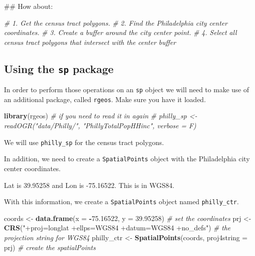 \documentclass[]{book}
\newenvironment{Shaded}{\begin{snugshade}}{\end{snugshade}}
\newcommand{\KeywordTok}[1]{\textcolor[rgb]{0.13,0.29,0.53}{\textbf{#1}}}
\newcommand{\DataTypeTok}[1]{\textcolor[rgb]{0.13,0.29,0.53}{#1}}
\newcommand{\FloatTok}[1]{\textcolor[rgb]{0.00,0.00,0.81}{#1}}
\newcommand{\StringTok}[1]{\textcolor[rgb]{0.31,0.60,0.02}{#1}}
\newcommand{\CommentTok}[1]{\textcolor[rgb]{0.56,0.35,0.01}{\textit{#1}}}
\newcommand{\OperatorTok}[1]{\textcolor[rgb]{0.81,0.36,0.00}{\textbf{#1}}}
\newcommand{\NormalTok}[1]{#1}
\theoremstyle{definition}
\theoremstyle{definition}
\theoremstyle{definition}
\theoremstyle{remark}
\begin{document}
\begin{Shaded}
\begin{Highlighting}[]
\NormalTok{## How about:}

\CommentTok{# 1. Get the census tract polygons.}
\CommentTok{# 2. Find the Philadelphia city center coordinates.}
\CommentTok{# 3. Create a buffer around the city center point.}
\CommentTok{# 4. Select all census tract polygons that intersect with the center buffer}
\end{Highlighting}
\end{Shaded}

\subsection{\texorpdfstring{Using the \texttt{sp}
package}{Using the sp package}}\label{using-the-sp-package}

In order to perform those operations on an \texttt{sp} object we will
need to make use of an additional package, called \texttt{rgeos}. Make
sure you have it loaded.

\begin{Shaded}
\begin{Highlighting}[]
\KeywordTok{library}\NormalTok{(rgeos)}
\CommentTok{# if you need to read it in again}
\CommentTok{# philly_sp <- readOGR("data/Philly/", "PhillyTotalPopHHinc", verbose = F)}
\end{Highlighting}
\end{Shaded}

We will use \texttt{philly\_sp} for the census tract polygons.

In addition, we need to create a \texttt{SpatialPoints} object with the
Philadelphia city center coordinates.

Lat is 39.95258 and Lon is -75.16522. This is in WGS84.

With this information, we create a \texttt{SpatialPoints} object named
\texttt{philly\_ctr}.

\begin{Shaded}
\begin{Highlighting}[]
\NormalTok{coords <-}\StringTok{ }\KeywordTok{data.frame}\NormalTok{(}\DataTypeTok{x =} \OperatorTok{-}\FloatTok{75.16522}\NormalTok{, }\DataTypeTok{y =} \FloatTok{39.95258}\NormalTok{) }\CommentTok{# set the coordinates}
\NormalTok{prj <-}\StringTok{ }\KeywordTok{CRS}\NormalTok{(}\StringTok{"+proj=longlat +ellps=WGS84 +datum=WGS84 +no_defs"}\NormalTok{) }\CommentTok{# the projection string for WGS84}
\NormalTok{philly_ctr <-}\StringTok{ }\KeywordTok{SpatialPoints}\NormalTok{(coords, }\DataTypeTok{proj4string =}\NormalTok{ prj) }\CommentTok{# create the spatialPoints}
\end{Highlighting}
\end{Shaded}
\end{document}
